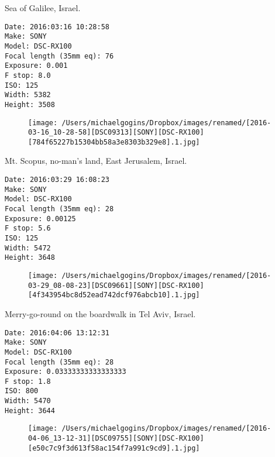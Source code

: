 \documentclass[11pt,letter,DIV=14,paper=landscape]{scrbook}
\begin{document}
\clearpage
\noindent Sea of Galilee, Israel.
\noindent
\begin{lstlisting}
Date: 2016:03:16 10:28:58
Make: SONY
Model: DSC-RX100
Focal length (35mm eq): 76
Exposure: 0.001
F stop: 8.0
ISO: 125
Width: 5382
Height: 3508
\end{lstlisting}
\clearpage

\begin{figure}
\texttt{[image: /Users/michaelgogins/Dropbox/images/renamed/[2016-03-16\_10-28-58][DSC09313][SONY][DSC-RX100][784f65227b15304bb58a3e8303b329e8].1.jpg]}
\end{figure}
    
\clearpage
\noindent Mt. Scopus, no-man's land, East Jerusalem, Israel.
\noindent
\begin{lstlisting}
Date: 2016:03:29 16:08:23
Make: SONY
Model: DSC-RX100
Focal length (35mm eq): 28
Exposure: 0.00125
F stop: 5.6
ISO: 125
Width: 5472
Height: 3648
\end{lstlisting}
\clearpage

\begin{figure}
\texttt{[image: /Users/michaelgogins/Dropbox/images/renamed/[2016-03-29\_08-08-23][DSC09661][SONY][DSC-RX100][4f343954bc8d52ead742dcf976abcb10].1.jpg]}
\end{figure}
    
\clearpage
\noindent Merry-go-round on the boardwalk in Tel Aviv, Israel.
\noindent
\begin{lstlisting}
Date: 2016:04:06 13:12:31
Make: SONY
Model: DSC-RX100
Focal length (35mm eq): 28
Exposure: 0.03333333333333333
F stop: 1.8
ISO: 800
Width: 5470
Height: 3644
\end{lstlisting}
\clearpage

\begin{figure}
\texttt{[image: /Users/michaelgogins/Dropbox/images/renamed/[2016-04-06\_13-12-31][DSC09755][SONY][DSC-RX100][e50c7c9f3d613f58ac154f7a991c9cd9].1.jpg]}
\end{figure}
    
\end{document}
